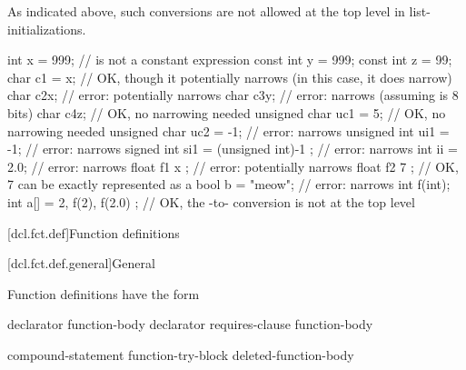 \begin{note}
As indicated above, such conversions are not allowed at the top level in
list-initializations.
\end{note}
\begin{example}
\begin{codeblock}
int x = 999;                    //  is not a constant expression
const int y = 999;
const int z = 99;
char c1 = x;                    // OK, though it potentially narrows (in this case, it does narrow)
char c2{x};                     // error: potentially narrows
char c3{y};                     // error: narrows (assuming  is 8 bits)
char c4{z};                     // OK, no narrowing needed
unsigned char uc1 = {5};        // OK, no narrowing needed
unsigned char uc2 = {-1};       // error: narrows
unsigned int ui1 = {-1};        // error: narrows
signed int si1 =
  { (unsigned int)-1 };         // error: narrows
int ii = {2.0};                 // error: narrows
float f1 { x };                 // error: potentially narrows
float f2 { 7 };                 // OK, 7 can be exactly represented as a 
bool b = {"meow"};              // error: narrows
int f(int);
int a[] = { 2, f(2), f(2.0) };  // OK, the -to- conversion is not at the top level
\end{codeblock}
\end{example}
%
%

[dcl.fct.def]{Function definitions}%

[dcl.fct.def.general]{General}

\pnum
{}%
Function definitions have the form
%
%
\begin{bnf}
\br
      declarator \br
    \bnfindent {} function-body\br
      declarator requires-clause\br
    \bnfindent {} function-body
\end{bnf}

\begin{bnf}
\br
     compound-statement\br
    function-try-block\br
    \terminal{=}  \terminal{;}\br
    deleted-function-body
\end{bnf}


